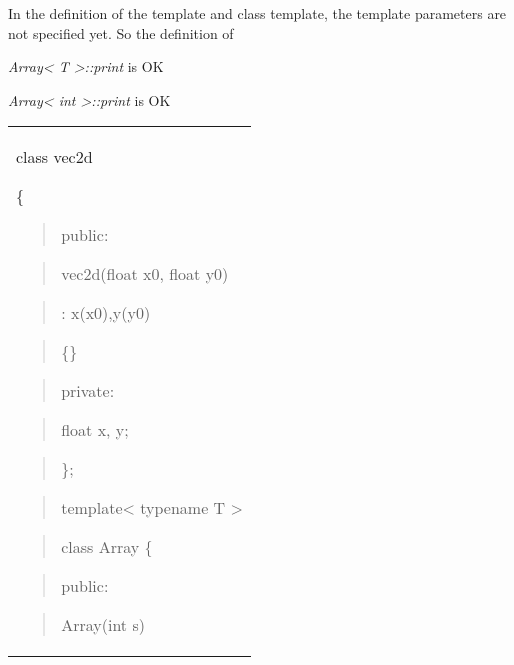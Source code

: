 \documentclass[
]{article}
\begin{document}
In the definition of the template and class template, the template
parameters are not specified yet. So the definition of

\emph{Array\textless{} T \textgreater::print} is OK

\emph{Array\textless{} int \textgreater::print} is OK

\begin{longtable}[]{@{}
  >{\raggedright\arraybackslash}p{}@{}}
\toprule\noalign{}
 \\
\midrule\noalign{}
\endhead
\bottomrule\noalign{}
\endlastfoot
class vec2d

\{

\begin{quote}
public:
\end{quote}

\begin{quote}
vec2d(float x0, float y0)
\end{quote}

\begin{quote}
: x(x0),y(y0)
\end{quote}

\begin{quote}
\{\}
\end{quote}

\begin{quote}
private:
\end{quote}

\begin{quote}
float x, y;
\end{quote}

\begin{quote}
\};
\end{quote}

\begin{quote}
\end{quote}

\begin{quote}
template\textless{} typename T \textgreater{}
\end{quote}

\begin{quote}
class Array \{
\end{quote}

\begin{quote}
public:
\end{quote}

\begin{quote}
Array(int s)
\end{quote}


\end{longtable}
\end{document}
